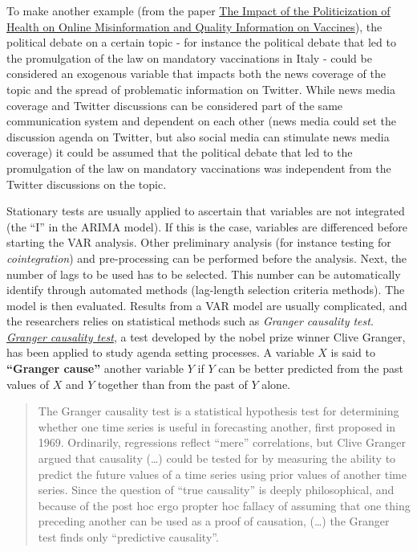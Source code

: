 \documentclass[
]{article}
\begin{document}
To make another example (from the paper \href{http://www.italiansociologicalreview.com/ojs/index.php?journal=ISR&page=article&op=view&path\%5B\%5D=448&path\%5B\%5D=346}{The Impact of the Politicization of Health on Online Misinformation and Quality Information on Vaccines}), the political debate on a certain topic - for instance the political debate that led to the promulgation of the law on mandatory vaccinations in Italy - could be considered an exogenous variable that impacts both the news coverage of the topic and the spread of problematic information on Twitter. While news media coverage and Twitter discussions can be considered part of the same communication system and dependent on each other (news media could set the discussion agenda on Twitter, but also social media can stimulate news media coverage) it could be assumed that the political debate that led to the promulgation of the law on mandatory vaccinations was independent from the Twitter discussions on the topic.

Stationary tests are usually applied to ascertain that variables are not integrated (the ``I'' in the ARIMA model). If this is the case, variables are differenced before starting the VAR analysis. Other preliminary analysis (for instance testing for \emph{cointegration}) and pre-processing can be performed before the analysis. Next, the number of lags to be used has to be selected. This number can be automatically identify through automated methods (lag-length selection criteria methods). The model is then evaluated. Results from a VAR model are usually complicated, and the researchers relies on statistical methods such as \emph{Granger causality test}. \href{https://en.wikipedia.org/wiki/Granger_causality}{\emph{Granger causality test}}, a test developed by the nobel prize winner Clive Granger, has been applied to study agenda setting processes. A variable \(X\) is said to \textbf{``Granger cause''} another variable \(Y\) if \(Y\) can be better predicted from the past values of \(X\) and \(Y\) together than from the past of \(Y\) alone.

\begin{quote}
The Granger causality test is a statistical hypothesis test for determining whether one time series is useful in forecasting another, first proposed in 1969. Ordinarily, regressions reflect ``mere'' correlations, but Clive Granger argued that causality (\ldots) could be tested for by measuring the ability to predict the future values of a time series using prior values of another time series. Since the question of ``true causality'' is deeply philosophical, and because of the post hoc ergo propter hoc fallacy of assuming that one thing preceding another can be used as a proof of causation, (\ldots) the Granger test finds only ``predictive causality''.
\end{quote}
\end{document}
